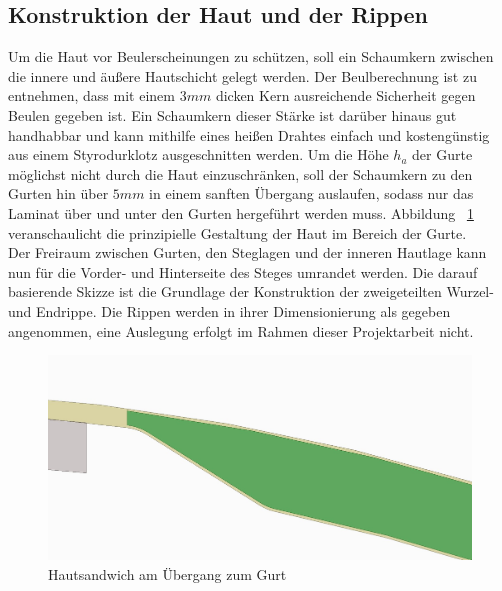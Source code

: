 \subsection{Konstruktion der Haut und der Rippen}
Um die Haut vor Beulerscheinungen zu schützen, soll ein Schaumkern zwischen die innere und äußere Hautschicht gelegt werden. Der Beulberechnung ist zu entnehmen, dass mit einem $ 3mm $ dicken Kern ausreichende Sicherheit gegen Beulen gegeben ist. Ein Schaumkern dieser Stärke ist darüber hinaus gut handhabbar und kann mithilfe eines heißen Drahtes einfach und kostengünstig aus einem Styrodurklotz ausgeschnitten werden. Um die Höhe $ h_{a} $ der Gurte möglichst nicht durch die Haut einzuschränken, soll der Schaumkern zu den Gurten hin über $ 5mm $ in einem sanften Übergang auslaufen, sodass nur das Laminat über und unter den Gurten hergeführt werden muss. Abbildung ~\ref{fig: Hautuebergang} veranschaulicht die prinzipielle Gestaltung der Haut im Bereich der Gurte.\\

\noindent Der Freiraum zwischen Gurten, den Steglagen und der inneren Hautlage kann nun für die Vorder- und Hinterseite des Steges umrandet werden. Die darauf basierende Skizze ist die Grundlage der Konstruktion der zweigeteilten Wurzel- und Endrippe. Die Rippen werden in ihrer Dimensionierung als gegeben angenommen, eine Auslegung erfolgt im Rahmen dieser Projektarbeit nicht.

\begin{figure}[h]
	\includegraphics[width=1.0\textwidth]{Bilder/Hautuebergang.jpg}
	\caption{Hautsandwich am Übergang zum Gurt}
	\label{fig: Hautuebergang}
\end{figure}

